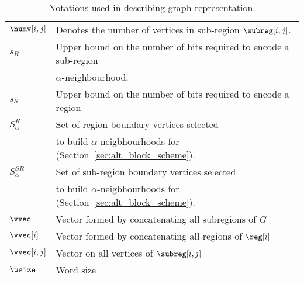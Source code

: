 \begin{table*}[ht]
\begin{tabular}{ l | l}
			$\numv[i,j]$ & Denotes the number of vertices in sub-region $\subreg[i,j]$. \\
			$s_R$ & Upper bound on the number of bits required to encode a sub-region \\
			& $\alpha$-neighbourhood. \\
			$s_S$ & Upper bound on the number of bits required to encode a region \\		
			$S^{R}_\alpha$ & Set of region boundary vertices selected \\
			& to build $\alpha$-neigbhourhoods for (Section~\ref{sec:alt_block_scheme}). \\
			$S^{SR}_\alpha$ & Set of sub-region boundary vertices selected \\
			& to build $\alpha$-neigbhourhoods for (Section~\ref{sec:alt_block_scheme}). \\ 
			$\vvec$ & Vector formed by concatenating all subregions of $G$ \\
			$\vvec[i]$ & Vector formed by concatenating all regions of $\reg[i]$ \\ 
			$\vvec[i,j]$ & Vector on all vertices of $\subreg[i,j]$ \\
			$\wsize$ & Word size \\ \hline
		\end{tabular}
	\caption{Notations used in describing graph representation.}
	\label{tab:notation}
\end{table*}
\newpage

